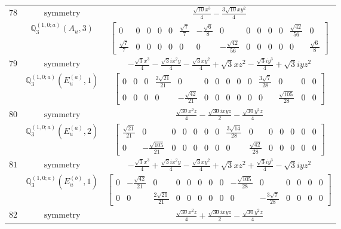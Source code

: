 \documentclass[fleqn,8pt,landscape]{jsarticle}
\begin{document}
\begin{longtable}{ccc}
$ 78 $ & $ \text{symmetry} $ & $ \frac{\sqrt{10} x^{3}}{4} - \frac{3 \sqrt{10} x y^{2}}{4} $ \\
$  $ & $ \mathbb{Q}_{3}^{(1,0;a)}(A_{u},3) $ & $ \begin{bmatrix} 0 & 0 & 0 & 0 & 0 & \frac{\sqrt{7}}{7} & - \frac{\sqrt{6}}{8} & 0 & 0 & 0 & 0 & 0 & \frac{\sqrt{42}}{56} & 0 \\ \frac{\sqrt{7}}{7} & 0 & 0 & 0 & 0 & 0 & 0 & - \frac{\sqrt{42}}{56} & 0 & 0 & 0 & 0 & 0 & \frac{\sqrt{6}}{8} \end{bmatrix} $ \\ \hline
$ 79 $ & $ \text{symmetry} $ & $ - \frac{\sqrt{3} x^{3}}{4} - \frac{\sqrt{3} i x^{2} y}{4} - \frac{\sqrt{3} x y^{2}}{4} + \sqrt{3} x z^{2} - \frac{\sqrt{3} i y^{3}}{4} + \sqrt{3} i y z^{2} $ \\
$  $ & $ \mathbb{Q}_{3}^{(1,0;a)}(E_{u}^{(a)},1) $ & $ \begin{bmatrix} 0 & 0 & 0 & \frac{2 \sqrt{21}}{21} & 0 & 0 & 0 & 0 & 0 & 0 & \frac{3 \sqrt{7}}{28} & 0 & 0 & 0 \\ 0 & 0 & 0 & 0 & - \frac{\sqrt{42}}{21} & 0 & 0 & 0 & 0 & 0 & 0 & \frac{\sqrt{105}}{28} & 0 & 0 \end{bmatrix} $ \\ \hline
$ 80 $ & $ \text{symmetry} $ & $ \frac{\sqrt{30} x^{2} z}{4} - \frac{\sqrt{30} i x y z}{2} - \frac{\sqrt{30} y^{2} z}{4} $ \\
$  $ & $ \mathbb{Q}_{3}^{(1,0;a)}(E_{u}^{(a)},2) $ & $ \begin{bmatrix} \frac{\sqrt{21}}{21} & 0 & 0 & 0 & 0 & 0 & 0 & \frac{3 \sqrt{14}}{28} & 0 & 0 & 0 & 0 & 0 & 0 \\ 0 & - \frac{\sqrt{105}}{21} & 0 & 0 & 0 & 0 & 0 & 0 & \frac{\sqrt{42}}{28} & 0 & 0 & 0 & 0 & 0 \end{bmatrix} $ \\ \hline
$ 81 $ & $ \text{symmetry} $ & $ - \frac{\sqrt{3} x^{3}}{4} + \frac{\sqrt{3} i x^{2} y}{4} - \frac{\sqrt{3} x y^{2}}{4} + \sqrt{3} x z^{2} + \frac{\sqrt{3} i y^{3}}{4} - \sqrt{3} i y z^{2} $ \\
$  $ & $ \mathbb{Q}_{3}^{(1,0;a)}(E_{u}^{(b)},1) $ & $ \begin{bmatrix} 0 & - \frac{\sqrt{42}}{21} & 0 & 0 & 0 & 0 & 0 & 0 & - \frac{\sqrt{105}}{28} & 0 & 0 & 0 & 0 & 0 \\ 0 & 0 & \frac{2 \sqrt{21}}{21} & 0 & 0 & 0 & 0 & 0 & 0 & - \frac{3 \sqrt{7}}{28} & 0 & 0 & 0 & 0 \end{bmatrix} $ \\ \hline
$ 82 $ & $ \text{symmetry} $ & $ \frac{\sqrt{30} x^{2} z}{4} + \frac{\sqrt{30} i x y z}{2} - \frac{\sqrt{30} y^{2} z}{4} $ \\

\end{longtable}
\end{document}
